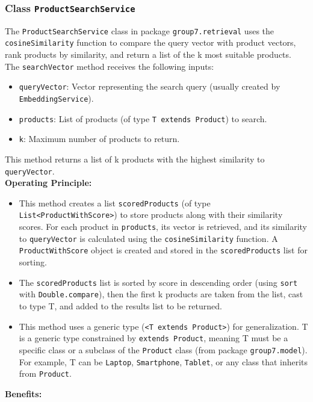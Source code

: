 \documentclass{article}
\begin{document}
\subsubsection{Class \texttt{ProductSearchService}}
The \texttt{ProductSearchService} class in package \texttt{group7.retrieval} uses the \texttt{cosineSimilarity} function to compare the query vector with product vectors, rank products by similarity, and return a list of the k most suitable products.
The \texttt{searchVector} method receives the following inputs:
\begin{itemize}
    \item \texttt{queryVector}: Vector representing the search query (usually created by \texttt{EmbeddingService}).
    \item \texttt{products}: List of products (of type \texttt{T extends Product}) to search.
    \item \texttt{k}: Maximum number of products to return.
\end{itemize}
This method returns a list of k products with the highest similarity to \texttt{queryVector}.\\
\textbf{Operating Principle:}
\begin{itemize}
    \item This method creates a list \texttt{scoredProducts} (of type \texttt{List<ProductWithScore>}) to store products along with their similarity scores. For each product in \texttt{products}, its vector is retrieved, and its similarity to \texttt{queryVector} is calculated using the \texttt{cosineSimilarity} function. A \texttt{ProductWithScore} object is created and stored in the \texttt{scoredProducts} list for sorting.
    \item The \texttt{scoredProducts} list is sorted by score in descending order (using \texttt{sort} with \texttt{Double.compare}), then the first k products are taken from the list, cast to type T, and added to the results list to be returned.
    \item This method uses a generic type (\texttt{<T extends Product>}) for generalization. T is a generic type constrained by \texttt{extends Product}, meaning T must be a specific class or a subclass of the \texttt{Product} class (from package \texttt{group7.model}). For example, T can be \texttt{Laptop}, \texttt{Smartphone}, \texttt{Tablet}, or any class that inherits from \texttt{Product}.
\end{itemize}
\textbf{Benefits:}
\end{document}
